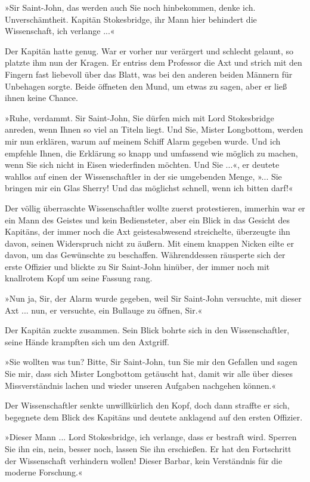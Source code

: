 »Sir Saint-John, das werden auch Sie noch hinbekommen, denke ich.
Unverschämtheit. Kapitän Stokesbridge, ihr Mann hier behindert die
Wissenschaft, ich verlange ...«

Der Kapitän hatte genug. War er vorher nur verärgert und schlecht
gelaunt, so platzte ihm nun der Kragen. Er entriss dem Professor
die Axt und strich mit den Fingern fast liebevoll über das Blatt,
was bei den anderen beiden Männern für Unbehagen sorgte. Beide
öffneten den Mund, um etwas zu sagen, aber er ließ ihnen keine
Chance.

»Ruhe, verdammt. Sir Saint-John, Sie dürfen mich mit Lord
Stokesbridge anreden, wenn Ihnen so viel an Titeln liegt. Und Sie,
Mister Longbottom, werden mir nun erklären, warum auf meinem Schiff
Alarm gegeben wurde. Und ich empfehle Ihnen, die Erklärung so knapp
und umfassend wie möglich zu machen, wenn Sie sich nicht in Eisen
wiederfinden möchten. Und Sie ...«, er deutete wahllos auf einen
der Wissenschaftler in der sie umgebenden Menge, »... Sie bringen
mir ein Glas Sherry! Und das möglichst schnell, wenn ich bitten
darf!«

Der völlig überraschte Wissenschaftler wollte zuerst protestieren,
immerhin war er ein Mann des Geistes und kein Bediensteter, aber
ein Blick in das Gesicht des Kapitäns, der immer noch die Axt
geistesabwesend streichelte, überzeugte ihn davon, seinen
Widerspruch nicht zu äußern. Mit einem knappen Nicken eilte er
davon, um das Gewünschte zu beschaffen. Währenddessen räusperte
sich der erste Offizier und blickte zu Sir Saint-John hinüber, der
immer noch mit knallrotem Kopf um seine Fassung rang.

»Nun ja, Sir, der Alarm wurde gegeben, weil Sir Saint-John
versuchte, mit dieser Axt ... nun, er versuchte, ein Bullauge zu
öffnen, Sir.«

Der Kapitän zuckte zusammen. Sein Blick bohrte sich in den
Wissenschaftler, seine Hände krampften sich um den Axtgriff.

»Sie wollten was tun? Bitte, Sir Saint-John, tun Sie mir den
Gefallen und sagen Sie mir, dass sich Mister Longbottom getäuscht
hat, damit wir alle über dieses Missverständnis lachen und wieder
unseren Aufgaben nachgehen können.«

Der Wissenschaftler senkte unwillkürlich den Kopf, doch dann
straffte er sich, begegnete dem Blick des Kapitäns und deutete
anklagend auf den ersten Offizier.

»Dieser Mann ... Lord Stokesbridge, ich verlange, dass er bestraft
wird. Sperren Sie ihn ein, nein, besser noch, lassen Sie ihn
erschießen. Er hat den Fortschritt der Wissenschaft verhindern
wollen! Dieser Barbar, kein Verständnis für die moderne
Forschung.«

